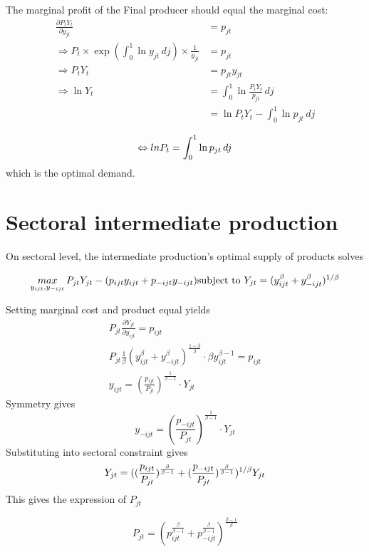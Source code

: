 \documentclass[12pt]{article} %
\begin{document}
The marginal profit of the Final producer should equal the marginal cost:
\[\begin{align}
	\frac{\partial P_t Y_t}{\partial y_{jt}} &= p_{jt}\\
	\Rightarrow
	P_t \times \exp{(\int_0^1 \ln y_{jt} \,dj)} \times \frac{1}{y_{jt}} &= p_{jt}\\
	\Rightarrow
	P_t Y_t &= p_{jt}y_{jt}\\
	\Rightarrow
	\ln Y_t &= \int^1_0 \ln \frac{P_tY_t}{p_{jt}}\, dj\\
		&= \ln P_tY_t - \int^1_0 \ln p_{jt}\, dj\\
\end{align}\]
\[\begin{equation}
	\Leftrightarrow
	lnP_t = \int^1_0 \ln p_{jt}\, dj\\
\end{equation}\]
which is the optimal demand.

\section{Sectoral intermediate production}
On sectoral level, the intermediate production's optimal supply of products solves

\[
	\mathop{max}\limits_{y_{ijt},y_{-ijt}} P_{jt} Y_{jt} - (p_{ijt}y_{ijt}+p_{-ijt}y_{-ijt})\\
	\text{subject to } Y_{jt} = (y_{ijt}^\beta +y_{-ijt}^\beta)^{1/ \beta}
\]

Setting marginal cost and product equal yields
\[\begin{align}
	P_{jt} \frac{\partial Y_{jt}}{\partial y_{ijt}} = p_{ijt}\\
	P_{jt} \frac{1}{\beta} (y_{ijt}^\beta +y_{-ijt}^\beta)^\frac{1-\beta}{\beta} \cdot \beta y_{ijt}^{\beta-1}=p_{ijt}\\
	y_{ijt} = (\frac{p_{ijt}}{P_{jt}})^\frac{1}{\beta-1}\cdot Y_{jt}
\end{align}\]
Symmetry gives
\[
y_{-ijt} = (\frac{p_{-ijt}}{P_{jt}})^\frac{1}{\beta-1}\cdot Y_{jt}
\]
Substituting into sectoral constraint gives 
\[
	Y_{jt} = ((\frac{p_{ijt}}{P_{jt}})^\frac{\beta}{\beta-1}+(\frac{p_{-ijt}}{P_{jt}})^\frac{\beta}{\beta-1})^{1/\beta} Y_{jt}\\
\]
This gives the expression of $P_{jt}$

\[\begin{equation}
	P_{jt} = (p_{ijt}^\frac{\beta}{\beta-1}+p_{-ijt}^\frac{\beta}{\beta-1})^\frac{\beta-1}{\beta}
\end{equation}\]
\end{document}
